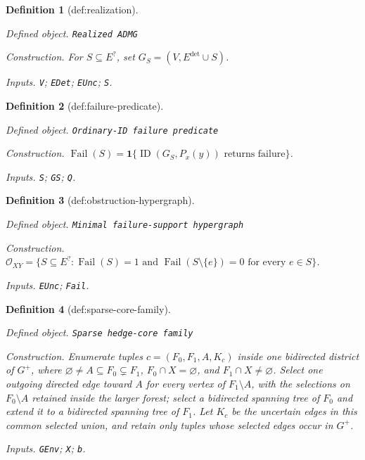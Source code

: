 \documentclass{article}
\newtheorem{definition}{Definition}
\begin{document}
\begin{definition}[def:realization]\label{def:realization}
\par\smallskip\noindent\emph{Defined object.} \texttt{Realized ADMG}
\par\smallskip\noindent\emph{Construction.} For \(S\subseteq E^{?}\), set \(G_S=(V,E^{\mathrm{det}}\cup S)\).
\par\smallskip\noindent\emph{Inputs.} \texttt{V}; \texttt{EDet}; \texttt{EUnc}; \texttt{S}.
\end{definition}

\begin{definition}[def:failure-predicate]\label{def:failure-predicate}
\par\smallskip\noindent\emph{Defined object.} \texttt{Ordinary-\allowbreak{}ID failure predicate}
\par\smallskip\noindent\emph{Construction.} \(\operatorname{Fail}(S)=\mathbf 1\{\operatorname{ID}(G_S,P_x(y))\text{ returns failure}\}\).
\par\smallskip\noindent\emph{Inputs.} \texttt{S}; \texttt{GS}; \texttt{Q}.
\end{definition}

\begin{definition}[def:obstruction-hypergraph]\label{def:obstruction-hypergraph}
\par\smallskip\noindent\emph{Defined object.} \texttt{Minimal failure-\allowbreak{}support hypergraph}
\par\smallskip\noindent\emph{Construction.} \(\mathcal O_{XY}=\{S\subseteq E^{?}:\operatorname{Fail}(S)=1\text{ and }\operatorname{Fail}(S\setminus\{e\})=0\text{ for every }e\in S\}\).
\par\smallskip\noindent\emph{Inputs.} \texttt{EUnc}; \texttt{Fail}.
\end{definition}

\begin{definition}[def:sparse-core-family]\label{def:sparse-core-family}
\par\smallskip\noindent\emph{Defined object.} \texttt{Sparse hedge-\allowbreak{}core family}
\par\smallskip\noindent\emph{Construction.} Enumerate tuples \(c=(F_0,F_1,A,K_c)\) inside one bidirected district of \(G^{+}\), where \(\varnothing\ne A\subseteq F_0\subsetneq F_1\), \(F_0\cap X=\varnothing\), and \(F_1\cap X\ne\varnothing\). Select one outgoing directed edge toward \(A\) for every vertex of \(F_1\setminus A\), with the selections on \(F_0\setminus A\) retained inside the larger forest; select a bidirected spanning tree of \(F_0\) and extend it to a bidirected spanning tree of \(F_1\). Let \(K_c\) be the uncertain edges in this common selected union, and retain only tuples whose selected edges occur in \(G^{+}\).
\par\smallskip\noindent\emph{Inputs.} \texttt{GEnv}; \texttt{X}; \texttt{b}.
\end{definition}
\end{document}
